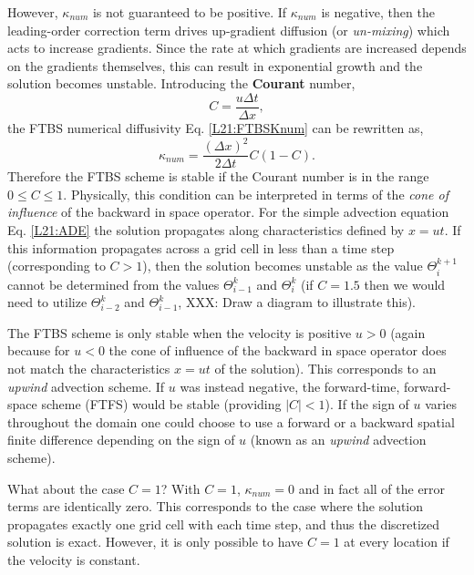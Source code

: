 However, $\kappa_{num}$ is not guaranteed to be positive. If
$\kappa_{num}$ is negative, then the leading-order correction term
drives up-gradient diffusion (or \textit{un-mixing}) which acts to
increase gradients. Since the rate at which gradients are increased
depends on the gradients themselves, this can result in exponential
growth and the solution becomes unstable. Introducing the
\textbf{Courant} number,
\begin{equation}
  C = \frac{u\Delta t}{\Delta x},
\end{equation}
the FTBS numerical diffusivity Eq. \eqref{L21:FTBSKnum} can be
rewritten as,
\begin{equation}
  \kappa_{num} = \frac{(\Delta x)^2}{2\Delta t}C(1-C).
\end{equation}
Therefore the FTBS scheme is stable if the Courant number is in the
range $0\leq C\leq 1$. Physically, this condition can be interpreted
in terms of the \textit{cone of influence} of the backward in space
operator. For the simple advection equation Eq. \eqref{L21:ADE} the
solution propagates along characteristics defined by $x=ut$. If this
information propagates across a grid cell in less than a time step
(corresponding to $C>1$), then the solution becomes unstable as the
value $\Theta_i^{k+1}$ cannot be determined from the values
$\Theta_{i-1}^k$ and $\Theta_i^k$ (if $C=1.5$ then we would need to
utilize $\Theta_{i-2}^k$ and $\Theta_{i-1}^k$, XXX: Draw a diagram to
illustrate this). 

The FTBS scheme is only stable when the velocity is positive $u>0$
(again because for $u<0$ the cone of influence of the backward in
space operator does not match the characteristics $x=ut$ of the
solution). This corresponds to an \textit{upwind} advection scheme. If
$u$ was instead negative, the forward-time, forward-space scheme
(FTFS) would be stable (providing $|C|<1$). If the sign of $u$ varies
throughout the domain one could choose to use a forward or a backward
spatial finite difference depending on the sign of $u$ (known as an
\textit{upwind} advection scheme).

What about the case $C=1$? With
$C=1$, $\kappa_{num}=0$ and in fact all of the error terms are
identically zero. This corresponds to the case where the solution
propagates exactly one grid cell with each time step, and thus
the discretized solution is exact. However, it is only
possible to have $C=1$ at every location if the velocity is constant.

